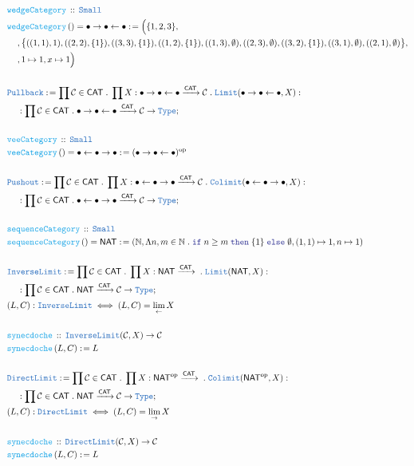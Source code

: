 \documentclass[12pt]{scrartcl}
\newcommand{\TYPE}[1]{\textcolor{NavyBlue}{\mathtt{#1}}}
\newcommand{\FUNC}[1]{\textcolor{Cerulean}{\mathtt{#1}}}
\newcommand{\LOGIC}[1]{\textcolor{Blue}{\mathtt{#1}}}
\renewcommand{\.}{\; . \;}
\newcommand{\de}{: \kern 0.1pc =}
\newcommand{\If}{\LOGIC{if} \;}
\newcommand{\Then}{ \; \LOGIC{then} \;}
\newcommand{\Else}{\; \LOGIC{else} \;}
\newcommand{\Act}[1]{\left( #1 \right)}
\newcommand{\DefineType}[3]{& #1 : \TYPE{#2} \iff #3 \\}
\newcommand{\DeclareFunc}[2]{& \FUNC{#1} \, :: \, #2 \\}
\newcommand{\DefineFunc}[3]{&  \FUNC{#1}\Act{#2} \de #3 \\}
\newcommand{\DefineNamedFunc}[4]{&  \FUNC{#1}\Act{#2} = #3 \de #4 \\}
\newcommand{\NewLine}{\\ & \kern 1pc}
\newcommand{\Page}[1]{ \begin{align*} #1 \end{align*}   }
\newcommand{\Type}{\TYPE{Type}}
\newcommand{\Nat}{\mathbb{N} }
\newcommand{\Arrow}{\xrightarrow}
\newcommand{\Conclude}[3]{& #1 \de #2 : #3; \\}
\newcommand{\op}{\mathrm{op}}
\newcommand{\C}{\mathcal{C}}
\newcommand{\CAT}{\mathsf{CAT}}
\newcommand{\VEE}{\bullet \leftarrow \bullet \to \bullet}
\begin{document}
\Page{
	\DeclareFunc{wedgeCategory}{\TYPE{Small}}
	\DefineNamedFunc{wedgeCategory}{}{ \bullet \to \bullet \leftarrow \bullet }
	{ \Big(  \{1,2,3\}, \NewLine,  \big\{ ((1,1),{1}),((2,2),\{1\}),((3,3),\{1\}), ((1,2),\{1\}),((1,3),\emptyset),
		((2,3),\emptyset),((3,2),\{1\}),((3,1),\emptyset),((2,1),\emptyset)  \big\},\NewLine,
		1 \mapsto 1, x \mapsto 1 \Big) 
	}
	\\
	\Conclude{\TYPE{Pullback}}{ \prod \C \in \CAT \. 
		\prod X  : \bullet \to \bullet \leftarrow \bullet  \Arrow{\CAT} \C \. 
		\TYPE{Limit}(\bullet \to \bullet \leftarrow \bullet, X)
		}
	{\NewLine : \prod \C \in \CAT \.  \bullet \to \bullet \leftarrow \bullet  \Arrow{\CAT} \C \to \Type }
	\\
	\DeclareFunc{veeCategory}{  \TYPE{Small}     }
	\DefineNamedFunc{ veeCategory }{   }{ \bullet \leftarrow \bullet \to \bullet  }
	{ (\bullet \to \bullet \leftarrow \bullet )^\op  }
	\\
	\Conclude{\TYPE{Pushout}}{  
		\prod \C \in \CAT \.  \prod X : \VEE \Arrow{\CAT} \C \. \TYPE{Colimit}(\VEE, X)
		}
	{
		\NewLine : \prod \C \in \CAT \.  \VEE \Arrow{\CAT} \C \to \Type
	}
	\\
	\DeclareFunc{sequenceCategory}{\TYPE{Small}}
	\DefineNamedFunc{sequenceCategory}{}{\mathsf{NAT}}
	{(\Nat, \Lambda n,m \in \Nat \. \If n \ge m \Then \{1\} \Else \emptyset, (1,1) \mapsto 1, n \mapsto 1 )}
	\\
	\Conclude{\TYPE{InverseLimit}}
	{
		\prod \C \in \CAT \. \prod X : \mathsf{NAT} \Arrow{\CAT} \. 
			\TYPE{Limit}(\mathsf{NAT}, X)	
	}
	{ \NewLine : \prod \C \in \CAT \. \mathsf{NAT} \Arrow{\CAT} \C \to \Type}
	\DefineType{(L,C)}{ \TYPE{InverseLimit}}{ (L,C) = \lim_{\leftarrow} X  }
	\\
	\DeclareFunc{synecdoche}{ \TYPE{InverseLimit}(\C,X) \to \C  }
	\DefineFunc{synecdoche}{L,C}{L}
	\\
	\Conclude{\TYPE{DirectLimit}}
	{
		\prod \C \in \CAT \. \prod X : \mathsf{NAT}^\op \Arrow{\CAT} \. \TYPE{Colimit}(\mathsf{NAT}^\op,X)
	}
	{
	   \NewLine : \prod \C \in \CAT \. \mathsf{NAT} \Arrow{\CAT} \C \to \Type
	}
	\DefineType{(L,C)}{ \TYPE{DirectLimit}}{ (L,C) = \lim_{\to} X  }
	\\
	\DeclareFunc{synecdoche}{ \TYPE{DirectLimit}(\C,X) \to \C  }
	\DefineFunc{synecdoche}{L,C}{L}
}
\newpage
\end{document}
